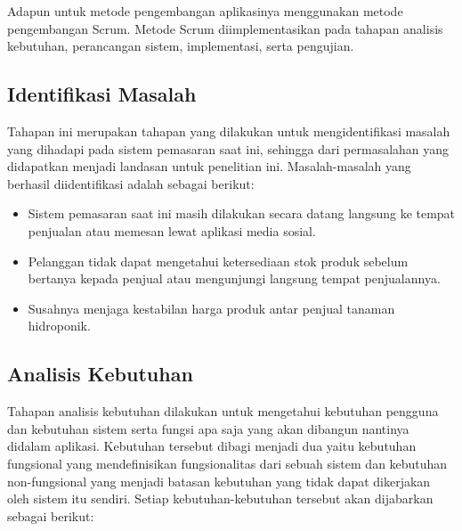 \par Adapun untuk metode pengembangan aplikasinya menggunakan metode pengembangan Scrum. Metode Scrum diimplementasikan pada tahapan analisis kebutuhan, perancangan sistem, implementasi, serta pengujian.

\fancyhf{} 
\fancyfoot[R]{\thepage}

\subsection{Identifikasi Masalah}
Tahapan ini merupakan tahapan yang dilakukan untuk mengidentifikasi masalah yang dihadapi pada sistem pemasaran saat ini, sehingga dari permasalahan yang didapatkan menjadi landasan untuk penelitian ini. Masalah-masalah yang berhasil diidentifikasi adalah sebagai berikut:

\begin{itemize}
	\item Sistem pemasaran saat ini masih dilakukan secara datang langsung ke tempat penjualan atau memesan lewat aplikasi media sosial.
	\item Pelanggan tidak dapat mengetahui ketersediaan stok produk sebelum bertanya kepada penjual atau mengunjungi langsung tempat penjualannya.
	\item Susahnya menjaga kestabilan harga produk antar penjual tanaman hidroponik.
\end{itemize}

\subsection{Analisis Kebutuhan}
Tahapan analisis kebutuhan dilakukan untuk mengetahui kebutuhan pengguna dan kebutuhan sistem serta fungsi apa saja yang akan dibangun nantinya didalam aplikasi. Kebutuhan tersebut dibagi menjadi dua yaitu kebutuhan fungsional yang mendefinisikan fungsionalitas dari sebuah sistem dan kebutuhan non-fungsional yang menjadi batasan kebutuhan yang tidak dapat dikerjakan oleh sistem itu sendiri. Setiap kebutuhan-kebutuhan tersebut akan dijabarkan sebagai berikut:

